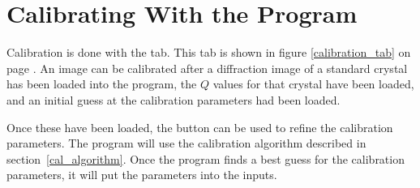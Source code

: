 \section{Calibrating With the Program}

Calibration is done with the
 tab. This tab is shown 
in figure \ref{calibration_tab} on page
\pageref{calibration_tab}. An image
can be calibrated after a diffraction
image of a standard crystal has been loaded
into the program, the $Q$ values for that
crystal have been loaded, and an initial guess 
at the calibration parameters had been loaded.

Once these have been loaded, the 
button can be used to refine the calibration
parameters. The program will use the calibration 
algorithm described in section~\ref{cal_algorithm}. 
Once the program finds a best guess for the 
calibration parameters, it will put the parameters 
into the inputs. 

